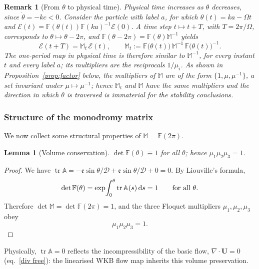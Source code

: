 \documentclass[reqno]{amsart}
\newcommand{\F}{\mathbb{F}}
\newcommand{\D}{\mathcal{D}}
\newcommand{\ee}{\mathfrak{e}}
\newcommand{\bu}{\mathbf{U}}             %
\newcommand{\tr}{\operatorname{tr}}     %
\newtheorem{lemma}[theorem]{Lemma}
\newtheorem{remark}[theorem]{Remark}
\begin{document}
\begin{remark}[From $\theta$ to physical time]\label{rem:time}
Physical time increases as $\theta$ {decreases}, since $\dot\theta=-kc<0$. Consider the particle with label $a$, for which $\theta(t)=ka-\Omega t$ and $\boldsymbol{\mathcal E}(t)=\F(\theta(t))\F(ka)^{-1}\boldsymbol{\mathcal E}(0)$. A time step $t\mapsto t+T$, with $T=2\pi/\Omega$, corresponds to $\theta\mapsto\theta-2\pi$, and $\F(\theta-2\pi)=\F(\theta)\mathbb M^{-1}$ yields
\begin{equation}\label{eq:oneperiodmap}
\boldsymbol{\mathcal E}(t+T)=\mathbb M_t\,\boldsymbol{\mathcal E}(t),\qquad
\mathbb M_t:=\F\bigl(\theta(t)\bigr)\,\mathbb M^{-1}\,\F\bigl(\theta(t)\bigr)^{-1}.
\end{equation}
The one-period map in physical time is therefore similar to $\mathbb M^{-1}$, for every instant $t$ and every label $a$; its multipliers are the reciprocals $1/\mu_i$. As shown in Proposition~\ref{prop:factor} below, the multipliers of $\mathbb M$ are of the form $\{1,\mu,\mu^{-1}\}$, a set invariant under $\mu\mapsto\mu^{-1}$; hence $\mathbb M_t$ and $\mathbb M$ have the same multipliers and the direction in which $\theta$ is traversed is immaterial for the stability conclusions.
\end{remark}

\subsubsection{Structure of the monodromy matrix}
We now collect some  structural properties of $\mathbb M=\F(2\pi)$.

\begin{lemma}[Volume conservation]\label{lem:det}
$\det\F(\theta)\equiv1$ for all $\theta$; hence $\mu_1\mu_2\mu_3=1$.
\end{lemma}
\begin{proof}
We have $\tr\mathbb A=-\ee\sin\theta/\D+\ee\sin\theta/\D+0=0$. By Liouville's formula,
\begin{equation}
\det\F(\theta)=\exp\!\int_0^\theta\tr\mathbb A(s)\,{\rm d}s=1 \qquad\text{for all }\theta .
\end{equation}
Therefore $\det\mathbb M=\det\F(2\pi)=1$, and the three Floquet multipliers $\mu_1,\mu_2,\mu_3$ obey
\begin{equation}
\mu_1\mu_2\mu_3=1. 
\end{equation}
\end{proof}
\noindent
Physically, $\tr\mathbb A=0$ reflects the incompressibility of the basic flow, $\nabla\cdot\bu=0$ (eq.~\eqref{div free}): the linearised WKB flow map inherits this volume preservation.
\end{document}
